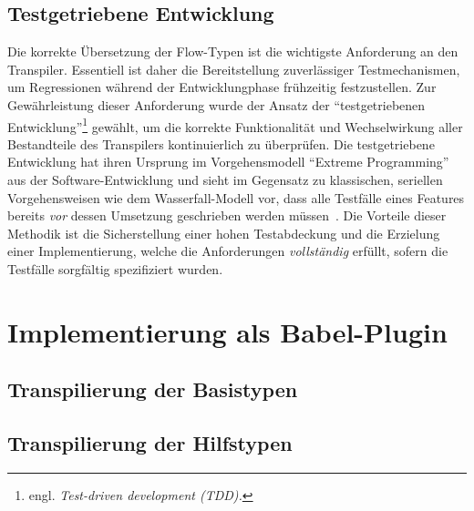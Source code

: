 \subsection{Testgetriebene Entwicklung}

Die korrekte Übersetzung der Flow-Typen ist die wichtigste Anforderung an den Transpiler. Essentiell ist daher die Bereitstellung zuverlässiger Testmechanismen, um Regressionen während der Entwicklungphase frühzeitig festzustellen. Zur Gewährleistung dieser Anforderung wurde der Ansatz der \enquote{testgetriebenen Entwicklung}\footnote{engl. \textit{Test-driven development (TDD).}} gewählt, um die korrekte Funktionalität und Wechselwirkung aller Bestandteile des Transpilers kontinuierlich zu überprüfen. Die testgetriebene Entwicklung hat ihren Ursprung im Vorgehensmodell \enquote{Extreme Programming}~\autocite{JEFFRIES:EXTREME_PROGRAMMING} aus der Software-Entwicklung und sieht im Gegensatz zu klassischen, seriellen Vorgehensweisen wie dem Wasserfall-Modell vor, dass alle Testfälle eines Features bereits \emph{vor} dessen Umsetzung geschrieben werden müssen~\autocite{KENT:EXTREME_PROGRAMMING}. Die Vorteile dieser Methodik ist die Sicherstellung einer hohen Testabdeckung und die Erzielung einer Implementierung, welche die Anforderungen \emph{vollständig} erfüllt, sofern die Testfälle sorgfältig spezifiziert wurden.







\section{Implementierung als Babel-Plugin}
  \subsection{Transpilierung der Basistypen}
  \subsection{Transpilierung der Hilfstypen}

